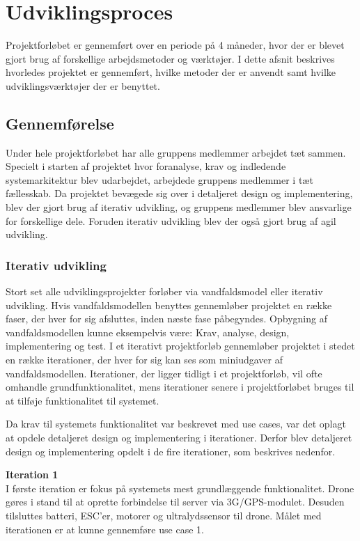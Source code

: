 \section{Udviklingsproces}
Projektforløbet er gennemført over en periode på 4 måneder, hvor der er blevet gjort brug af forskellige arbejdsmetoder og værktøjer. I dette afsnit beskrives hvorledes projektet er gennemført, hvilke metoder der er anvendt samt hvilke udviklingsværktøjer der er benyttet.

\subsection{Gennemførelse}
Under hele projektforløbet har alle gruppens medlemmer arbejdet tæt sammen. Specielt i starten af projektet hvor foranalyse, krav og indledende systemarkitektur blev udarbejdet, arbejdede gruppens medlemmer i tæt fællesskab. 
Da projektet bevægede sig over i detaljeret design og implementering, blev der gjort brug af iterativ udvikling, og gruppens medlemmer blev ansvarlige for forskellige dele. Foruden iterativ udvikling blev der også gjort brug af agil udvikling.


\subsubsection*{Iterativ udvikling}
Stort set alle udviklingsprojekter forløber via vandfaldsmodel eller iterativ udvikling. 
Hvis vandfaldsmodellen benyttes gennemløber projektet en række faser, der hver for sig afsluttes, inden næste fase påbegyndes. Opbygning af vandfaldsmodellen kunne eksempelvis være: Krav, analyse, design, implementering og test.
I et iterativt projektforløb gennemløber projektet i stedet en række iterationer, der hver for sig kan ses som miniudgaver af vandfaldsmodellen. Iterationer, der ligger tidligt i et projektforløb, vil ofte omhandle grundfunktionalitet, mens iterationer senere i projektforløbet bruges til at tilføje funktionalitet til systemet. 

\newpage 

Da krav til systemets funktionalitet var beskrevet med use cases, var det oplagt at opdele detaljeret design og implementering  i iterationer. Derfor blev detaljeret design og implementering opdelt i de fire iterationer, som beskrives nedenfor.  

\textbf{Iteration 1}\\
I første iteration er fokus på systemets mest grundlæggende funktionalitet. 
Drone gøres i stand til at oprette forbindelse til server via 3G/GPS-modulet.
Desuden tilsluttes batteri, ESC'er, motorer og ultralydssensor til drone. 
Målet med iterationen er at kunne gennemføre use case 1. \\

